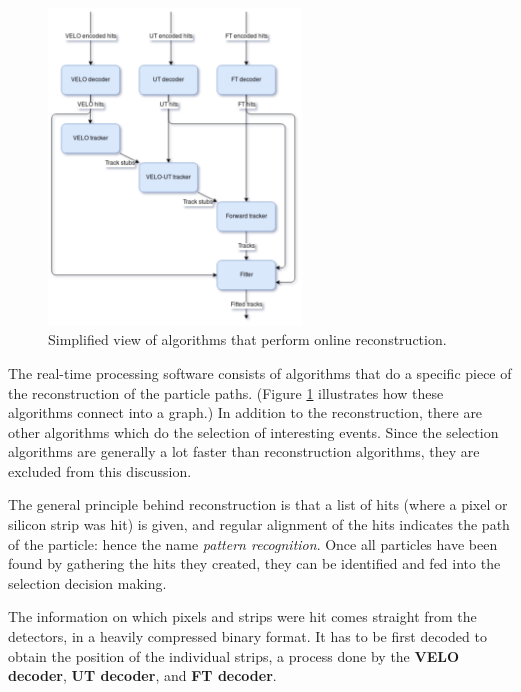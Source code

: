 \documentclass[12pt]{article}
\begin{document}
\begin{figure}[h]
	\begin{center}
		\includegraphics[width=0.6\textwidth]{algorithms_brunel}
	\end{center}
	\caption{Simplified view of algorithms that perform online reconstruction.}
	\label{fig_algorithms_brunel}
\end{figure}

The real-time processing software consists of algorithms that do a specific piece of the reconstruction of the particle paths. (Figure \ref{fig_algorithms_brunel} illustrates how these algorithms connect into a graph.) In addition to the reconstruction, there are other algorithms which do the selection of interesting events. Since the selection algorithms are generally a lot faster than reconstruction algorithms, they are excluded from this discussion.

The general principle behind reconstruction is that a list of hits (where a pixel or silicon strip was hit) is given, and regular alignment of the hits indicates the path of the particle: hence the name \textit{pattern recognition}. Once all particles have been found by gathering the hits they created, they can be identified and fed into the selection decision making.

The information on which pixels and strips were hit comes straight from the detectors, in a heavily compressed binary format. It has to be first decoded to obtain the position of the individual strips, a process done by the \textbf{VELO decoder}, \textbf{UT decoder}, and \textbf{FT decoder}.
\end{document}
